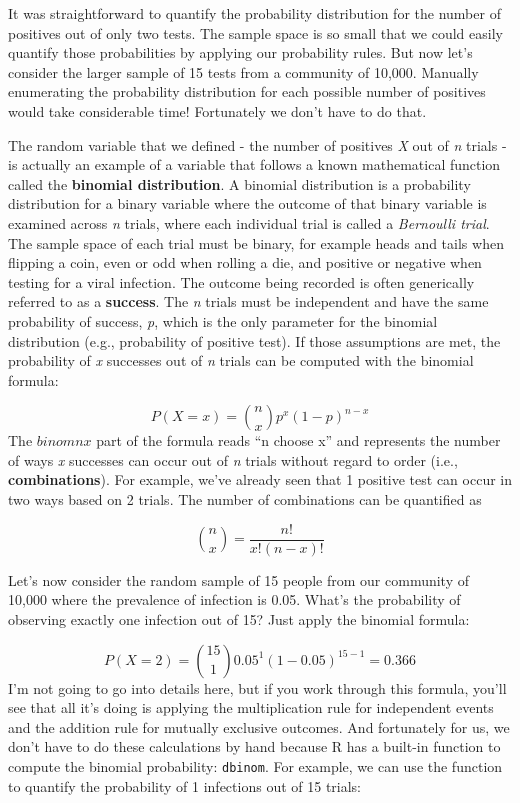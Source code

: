 \documentclass[
]{book}
\begin{document}
It was straightforward to quantify the probability distribution for the number of positives out of only two tests. The sample space is so small that we could easily quantify those probabilities by applying our probability rules. But now let's consider the larger sample of 15 tests from a community of 10,000. Manually enumerating the probability distribution for each possible number of positives would take considerable time! Fortunately we don't have to do that.

The random variable that we defined - the number of positives \emph{X} out of \emph{n} trials - is actually an example of a variable that follows a known mathematical function called the \textbf{binomial distribution}. A binomial distribution is a probability distribution for a binary variable where the outcome of that binary variable is examined across \emph{n} trials, where each individual trial is called a \emph{Bernoulli trial}. The sample space of each trial must be binary, for example heads and tails when flipping a coin, even or odd when rolling a die, and positive or negative when testing for a viral infection. The outcome being recorded is often generically referred to as a \textbf{success}. The \emph{n} trials must be independent and have the same probability of success, \emph{p}, which is the only parameter for the binomial distribution (e.g., probability of positive test). If those assumptions are met, the probability of \emph{x} successes out of \emph{n} trials can be computed with the binomial formula:

\[
P(X = x) = \binom{n}{x} p^x (1 - p)^{n - x}
\]
The \(binom{n}{x}\) part of the formula reads ``n choose x'' and represents the number of ways \emph{x} successes can occur out of \emph{n} trials without regard to order (i.e., \textbf{combinations}). For example, we've already seen that 1 positive test can occur in two ways based on 2 trials. The number of combinations can be quantified as

\[
\binom{n}{x} = \frac{n!}{x!(n-x)!}
\]

Let's now consider the random sample of 15 people from our community of 10,000 where the prevalence of infection is 0.05. What's the probability of observing exactly one infection out of 15? Just apply the binomial formula:

\[
P(X = 2) = \binom{15}{1} 0.05^1 (1 - 0.05)^{15 - 1}=0.366
\]
I'm not going to go into details here, but if you work through this formula, you'll see that all it's doing is applying the multiplication rule for independent events and the addition rule for mutually exclusive outcomes. And fortunately for us, we don't have to do these calculations by hand because R has a built-in function to compute the binomial probability: \texttt{dbinom}. For example, we can use the function to quantify the probability of 1 infections out of 15 trials:
\end{document}
